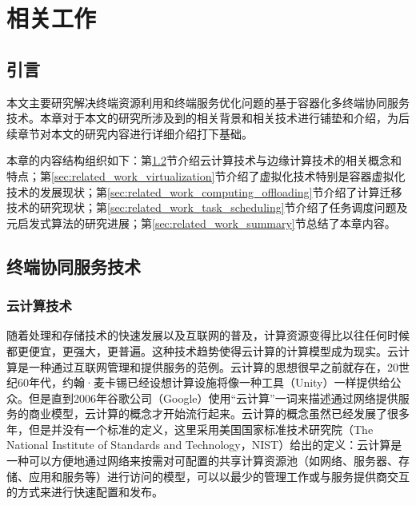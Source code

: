 \chapter{相关工作 }\label{chap:related_work}

\section{引言}

本文主要研究解决终端资源利用和终端服务优化问题的基于容器化多终端协同服务技术。本章对于本文的研究所涉及到的相关背景和相关技术进行铺垫和介绍，为后续章节对本文的研究内容进行详细介绍打下基础。

本章的内容结构组织如下：第\ref{sec:related_work_cloud_computing}节介绍云计算技术与边缘计算技术的相关概念和特点；第\ref{sec:related_work_virtualization}节介绍了虚拟化技术特别是容器虚拟化技术的发展现状；第\ref{sec:related_work_computing_offloading}节介绍了计算迁移技术的研究现状；第\ref{sec:related_work_task_scheduling}节介绍了任务调度问题及元启发式算法的研究进展；第\ref{sec:related_work_summary}节总结了本章内容。

\section{终端协同服务技术}\label{sec:related_work_cloud_computing}

\subsection{云计算技术}

随着处理和存储技术的快速发展以及互联网的普及，计算资源变得比以往任何时候都更便宜，更强大，更普遍。这种技术趋势使得云计算的计算模型成为现实。云计算是一种通过互联网管理和提供服务的范例\cite{zhang2010cloud,josep2010view}。云计算的思想很早之前就存在，20世纪60年代，约翰·麦卡锡已经设想计算设施将像一种工具（Unity）一样提供给公众\cite{parkhill1966challenge}。但是直到2006年谷歌公司（Google）使用“云计算”一词来描述通过网络提供服务的商业模型，云计算的概念才开始流行起来。云计算的概念虽然已经发展了很多年，但是并没有一个标准的定义\cite{sonnek2009virtual}，这里采用美国国家标准技术研究院（The National Institute of Standards and Technology，NIST）给出的定义\cite{zhang2010cloud}：云计算是一种可以方便地通过网络来按需对可配置的共享计算资源池（如网络、服务器、存储、应用和服务等）进行访问的模型，可以以最少的管理工作或与服务提供商交互的方式来进行快速配置和发布。

